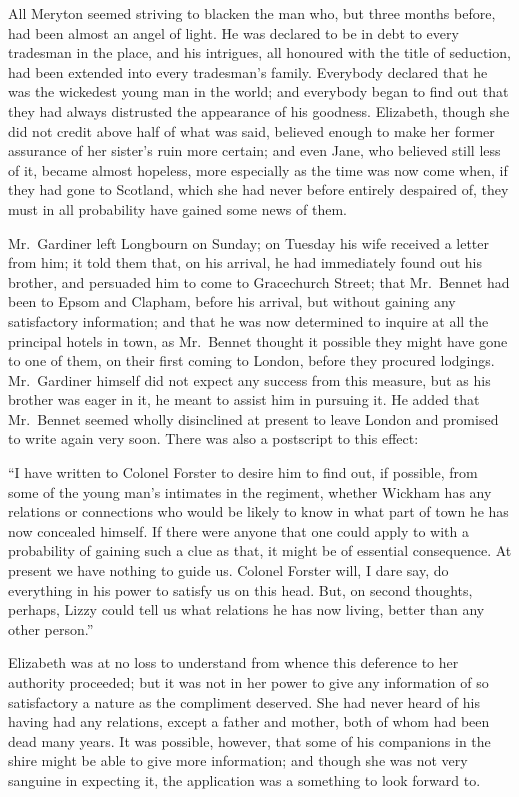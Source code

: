 All Meryton seemed striving to blacken the man who, but three
months before, had been almost an angel of light.  He was
declared to be in debt to every tradesman in the place, and his
intrigues, all honoured with the title of seduction, had been
extended into every tradesman's family.  Everybody declared
that he was the wickedest young man in the world; and everybody
began to find out that they had always distrusted the appearance
of his goodness.  Elizabeth, though she did not credit above
half of what was said, believed enough to make her former
assurance of her sister's ruin more certain; and even Jane,
who believed still less of it, became almost hopeless, more
especially as the time was now come when, if they had gone to
Scotland, which she had never before entirely despaired of,
they must in all probability have gained some news of them.

Mr.\ Gardiner left Longbourn on Sunday; on Tuesday his wife
received a letter from him; it told them that, on his arrival,
he had immediately found out his brother, and persuaded him to
come to Gracechurch Street; that Mr.\ Bennet had been to
Epsom and Clapham, before his arrival, but without gaining
any satisfactory information; and that he was now determined
to inquire at all the principal hotels in town, as Mr.\ Bennet
thought it possible they might have gone to one of them, on
their first coming to London, before they procured lodgings.
Mr.\ Gardiner himself did not expect any success from this
measure, but as his brother was eager in it, he meant to assist
him in pursuing it.  He added that Mr.\ Bennet seemed wholly
disinclined at present to leave London and promised to write
again very soon.  There was also a postscript to this effect:

``I have written to Colonel Forster to desire him to find out,
if possible, from some of the young man's intimates in the
regiment, whether Wickham has any relations or connections
who would be likely to know in what part of town he has now
concealed himself.  If there were anyone that one could apply
to with a probability of gaining such a clue as that, it might be
of essential consequence.  At present we have nothing to guide
us.  Colonel Forster will, I dare say, do everything in his power
to satisfy us on this head.  But, on second thoughts, perhaps,
Lizzy could tell us what relations he has now living, better than
any other person.''

Elizabeth was at no loss to understand from whence this
deference to her authority proceeded; but it was not in her
power to give any information of so satisfactory a nature as the
compliment deserved.  She had never heard of his having had
any relations, except a father and mother, both of whom had
been dead many years.  It was possible, however, that some of
his companions in the \gdash{}shire might be able to give more
information; and though she was not very sanguine in expecting
it, the application was a something to look forward to.

